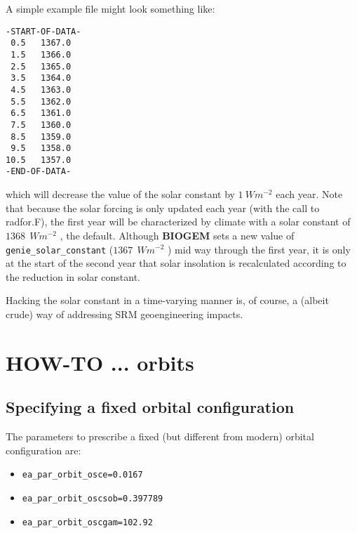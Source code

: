 \documentclass[11pt,fleqn]{book} %
\begin{document}
A simple example file might look something like:
\vspace{-2mm}\small\begin{verbatim}
-START-OF-DATA-
 0.5   1367.0
 1.5   1366.0
 2.5   1365.0
 3.5   1364.0
 4.5   1363.0
 5.5   1362.0
 6.5   1361.0
 7.5   1360.0
 8.5   1359.0
 9.5   1358.0
10.5   1357.0
-END-OF-DATA-
\end{verbatim}\normalsize\vspace{-2mm}
which will decrease the value of the solar constant by \(1 \:W m^{-2}\) each year. Note that because the solar forcing is only updated each year (with the call to \textsf{\footnotesize radfor.F}), the first year will be characterized by climate with a solar constant of \(1368\:\ W m^{-2}\) , the default. Although \textbf{BIOGEM} sets a new value of \texttt{genie\_solar\_constant} (\(1367\:\ W m^{-2}\) ) mid way through the first year, it is only at the start of the second year that solar insolation is recalculated according to the reduction in solar constant.

Hacking the solar constant in a time-varying manner is, of course, a (albeit crude) way of addressing SRM geoengineering impacts.


\newpage


\section{HOW-TO ... orbits}
\vspace{2mm}

%
\subsection*{Specifying a fixed orbital configuration}

The parameters to prescribe a fixed (but different from modern) orbital configuration are:

\vspace{1mm}
\begin{itemize}[noitemsep]
\setlength{\itemindent}{.2in}
\item \small\begin{verbatim}
ea_par_orbit_osce=0.0167
\end{verbatim}\normalsize
\item \small\begin{verbatim}
ea_par_orbit_oscsob=0.397789
\end{verbatim}\normalsize
\item \small\begin{verbatim}
ea_par_orbit_oscgam=102.92
\end{verbatim}\normalsize
\end{itemize}
\vspace{1mm}
\end{document}
